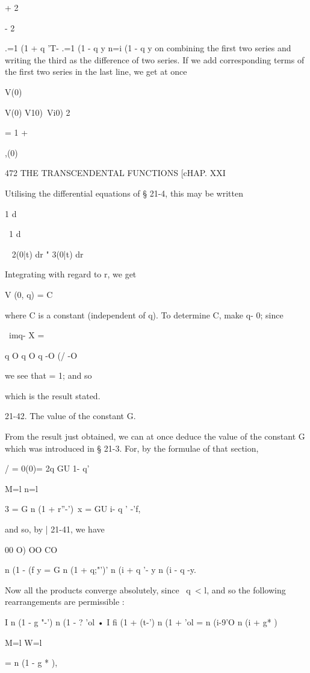 + 2

- 2

.=1 (1 + q 'T- .=1 (1 - q y n=i (1 - q y on combining the first two
series and writing the third as the difference of two series. If we
add corresponding terms of the first two series in the last line, we
get at once

V(0)

 V(0) V10)\ Vi0) 2

= 1 +

 ,(0) %

472 THE TRANSCENDENTAL FUNCTIONS [cHAP. XXI

Utilising the differential equations of § 21-4, this may be written

1 d%

\ 1 d%

~ 2(0|t) dr " 3(0|t) dr %

Integrating with regard to r, we get

V (0, q) = C%

where C is a constant (independent of q). To determine C, make q- 0;
since

\ imq- X = %

q O q O q -O (/ -O

we see that = 1; and so

which is the result stated.

21-42. The value of the constant G.

From the result just obtained, we can at once deduce the value of the
constant G which was introduced in § 21-3. For, by the formulae of
that section,

 / = 0(0)= 2q GU 1- q' %

M=l n=l

 3 = G n (1 + r''-')\ x = GU i- q ' -'f,

and so, by | 21-41, we have

00 O) OO CO

n (1 - (f y = G n (1 + q;"')' n (i + q '- y n (i - q -y.

Now all the products converge absolutely, since \ q\ < l, and so the
following rearrangements are permissible :

I n (1 - g "-') n (1 - ? 'ol • I fi (1 + (t-') n (1 + 'ol = n (i-9'O n
(i + g* )

M=l W=l

= n (1 - g * ),

